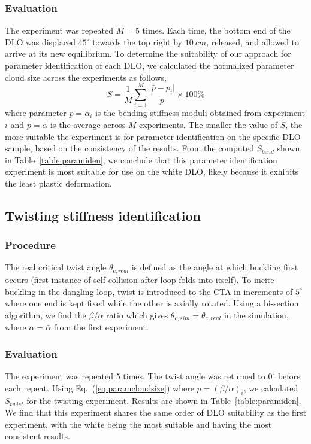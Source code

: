 \documentclass[letterpaper, 10 pt, conference]{ieeeconf}  %
\begin{document}
\subsubsection{Evaluation}
The experiment was repeated $M=5$ times. Each time, the bottom end of the DLO was displaced $45^\circ$ towards the top right by $\SI{10}{cm}$, released, and allowed to arrive at its new equilibrium. To determine the suitability of our approach for parameter identification of each DLO, we calculated the normalized parameter cloud size \cite{shutov2020sample} across the experiments as follows,
\begin{equation}
	\label{eq:paramcloudsize}
	S = \frac{1}{M} \sum_{i=1}^{M} \frac{\lvert \bar{p} - p_i \rvert}{\bar{p}}\times100\%
\end{equation}
where parameter $p = \alpha_i$ is the bending stiffness moduli obtained from experiment $i$ and $\bar{p} = \bar{\alpha}$ is the average across $M$ experiments. The smaller the value of $S$, the more suitable the experiment is for parameter identification on the specific DLO sample, based on the consistency of the results. From the computed $S_{bend}$ shown in Table~\ref{table:paramiden}, we conclude that this parameter identification experiment is most suitable for use on the white DLO, likely because it exhibits the least plastic deformation.

\subsection{Twisting stiffness identification}
\subsubsection{Procedure}
The real critical twist angle $\theta_{c,real}$ is defined as the angle at which buckling first occurs (first instance of self-collision after loop folds into itself). To incite buckling in the dangling loop, twist is introduced to the CTA in increments of $5^\circ$ where one end is kept fixed while the other is axially rotated. Using a bi-section algorithm, we find the $\beta/\alpha$ ratio which gives $\theta_{c,sim} = \theta_{c,real}$ in the simulation, where $\alpha = \bar{\alpha}$ from the first experiment.
\subsubsection{Evaluation}
The experiment was repeated 5 times. The twist angle was returned to $0^\circ$ before each repeat. Using Eq.~(\ref{eq:paramcloudsize}) where $p = (\beta/\alpha)_i$, we calculated $S_{twist}$ for the twisting experiment. Results are shown in Table~\ref{table:paramiden}. We find that this experiment shares the same order of DLO suitability as the first experiment, with the white being the most suitable and having the most consistent results.
\end{document}

